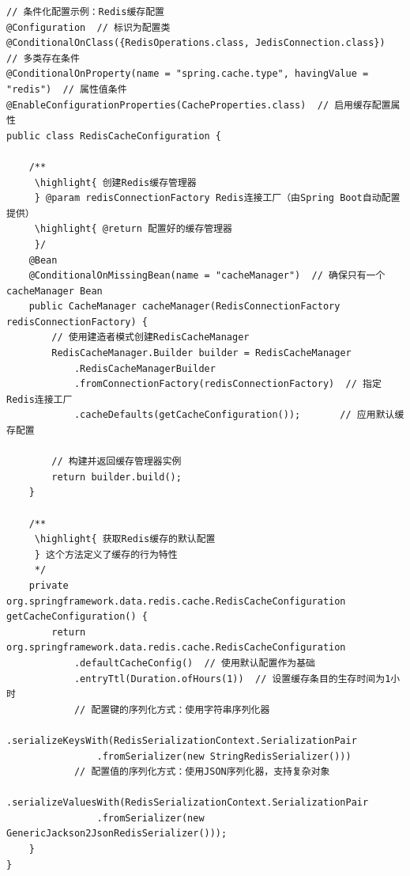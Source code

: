 \begin{lstlisting}[style=java]
// 条件化配置示例：Redis缓存配置
@Configuration  // 标识为配置类
@ConditionalOnClass({RedisOperations.class, JedisConnection.class})  // 多类存在条件
@ConditionalOnProperty(name = "spring.cache.type", havingValue = "redis")  // 属性值条件
@EnableConfigurationProperties(CacheProperties.class)  // 启用缓存配置属性
public class RedisCacheConfiguration {
    
    /**
     \highlight{ 创建Redis缓存管理器
     } @param redisConnectionFactory Redis连接工厂（由Spring Boot自动配置提供）
     \highlight{ @return 配置好的缓存管理器
     }/
    @Bean
    @ConditionalOnMissingBean(name = "cacheManager")  // 确保只有一个cacheManager Bean
    public CacheManager cacheManager(RedisConnectionFactory redisConnectionFactory) {
        // 使用建造者模式创建RedisCacheManager
        RedisCacheManager.Builder builder = RedisCacheManager
            .RedisCacheManagerBuilder
            .fromConnectionFactory(redisConnectionFactory)  // 指定Redis连接工厂
            .cacheDefaults(getCacheConfiguration());       // 应用默认缓存配置
        
        // 构建并返回缓存管理器实例
        return builder.build();
    }
    
    /**
     \highlight{ 获取Redis缓存的默认配置
     } 这个方法定义了缓存的行为特性
     */
    private org.springframework.data.redis.cache.RedisCacheConfiguration getCacheConfiguration() {
        return org.springframework.data.redis.cache.RedisCacheConfiguration
            .defaultCacheConfig()  // 使用默认配置作为基础
            .entryTtl(Duration.ofHours(1))  // 设置缓存条目的生存时间为1小时
            // 配置键的序列化方式：使用字符串序列化器
            .serializeKeysWith(RedisSerializationContext.SerializationPair
                .fromSerializer(new StringRedisSerializer()))
            // 配置值的序列化方式：使用JSON序列化器，支持复杂对象
            .serializeValuesWith(RedisSerializationContext.SerializationPair
                .fromSerializer(new GenericJackson2JsonRedisSerializer()));
    }
}
\end{lstlisting}


